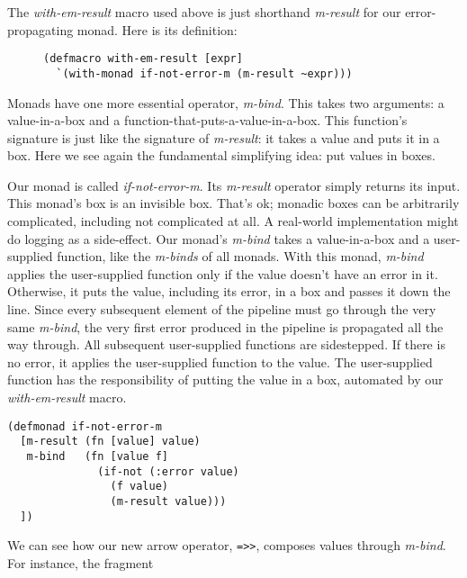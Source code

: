 \documentclass[11pt]{article}
\begin{document}
The \emph{with-em-result} macro used above is just shorthand \emph{m-result} for
our error-propagating monad. Here is its definition:
\begin{figure}[H]
\label{with-em-result-macro}
\begin{verbatim}
(defmacro with-em-result [expr]
  `(with-monad if-not-error-m (m-result ~expr)))
\end{verbatim}
\end{figure}

Monads have one more essential operator, \emph{m-bind}. This takes two
arguments: a value-in-a-box and a
function-that-puts-a-value-in-a-box. This function's signature is
just like the signature of \emph{m-result}: it takes a value and puts it
in a box. Here we see again the fundamental simplifying idea: put
values in boxes.

Our monad is called \emph{if-not-error-m}. Its \emph{m-result} operator
simply returns its input. This monad's box is an invisible box.
That's ok; monadic boxes can be arbitrarily complicated, including
not complicated at all. A real-world implementation might do
logging as a side-effect. Our monad's \emph{m-bind} takes a
value-in-a-box and a user-supplied function, like the \emph{m-binds} of
all monads. With this monad, \emph{m-bind} applies the user-supplied
function only if the value doesn't have an error in it. Otherwise,
it puts the value, including its error, in a box and passes it down
the line. Since every subsequent element of the pipeline must go
through the very same \emph{m-bind}, the very first error produced in
the pipeline is propagated all the way through. All subsequent
user-supplied functions are sidestepped. If there is no error, it
applies the user-supplied function to the value. The user-supplied
function has the responsibility of putting the value in a box,
automated by our \emph{with-em-result} macro.
\begin{verbatim}
(defmonad if-not-error-m
  [m-result (fn [value] value)
   m-bind   (fn [value f]
              (if-not (:error value)
                (f value) 
                (m-result value)))
  ])
\end{verbatim}

We can see how our new arrow operator, \verb|=>>|, composes values
through \emph{m-bind}. For instance, the fragment
\end{document}
